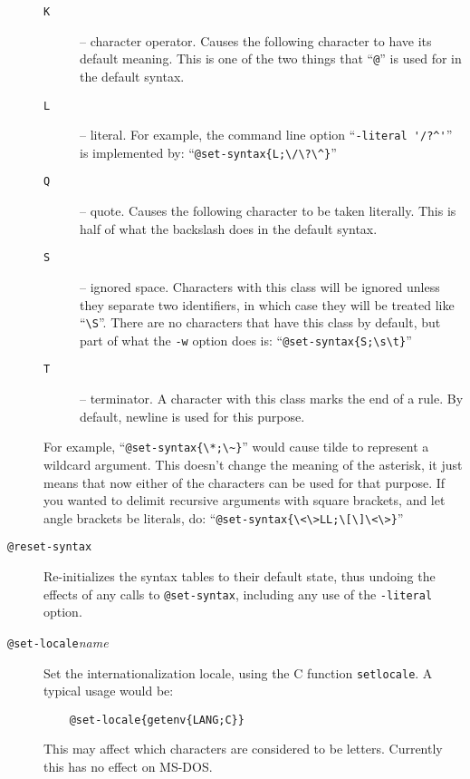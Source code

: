 \begin{description}
\begin{description}
    \item[\tt K] -- character operator.  Causes the following character
	to have its default meaning.  This is one of the two things that
	``\verb/@/'' is used for in the default syntax.
    \item[\tt L] -- literal.  For example, the command line option 
	``\verb|-literal '/?^'|'' is implemented by:
	``\verb|@set-syntax{L;\/\?\^}|''
    \item[\tt Q] -- quote.  Causes the following character to be taken
	literally.  This is half of what the backslash does in the
	default syntax.
    \item[\tt S] -- ignored space.  Characters with this class will be
	ignored unless they separate two identifiers, in which case they
	will be treated like ``\verb/\S/''.  There are no characters
	that have this class by default, but part of what the \verb/-w/
	option does is: ``\verb/@set-syntax{S;\s\t}/''
    \item[\tt T] -- terminator.  A character with this class marks the
	end of a rule.  By default, newline is used for this purpose.
 \end{description}
For example,  ``\verb/@set-syntax{\*;\~}/'' would cause tilde to
represent a wildcard argument.  This doesn't change the meaning of the
asterisk, it just means that now either of the characters can be used
for that purpose.  If you wanted to delimit recursive arguments with
square brackets, and let angle brackets be literals, do:
``\verb/@set-syntax{\<\>LL;\[\]\<\>}/''

\item[{\tt @reset-syntax\ttlb\ttrb}]
Re-initializes the syntax tables to their default state, thus undoing the
effects of any calls to \verb|@set-syntax|, including any use of the
\verb/-literal/ option.

\item[{\tt @set-locale\ttlb}{\it name}{\tt \ttrb}]
Set the internationalization locale, using the C function
{\tt setlocale}.
A typical usage would be:
\begin{verbatim}
    @set-locale{getenv{LANG;C}}
\end{verbatim}
This may affect which characters are considered to be letters.
Currently this has no effect on MS-DOS.
\end{description}

